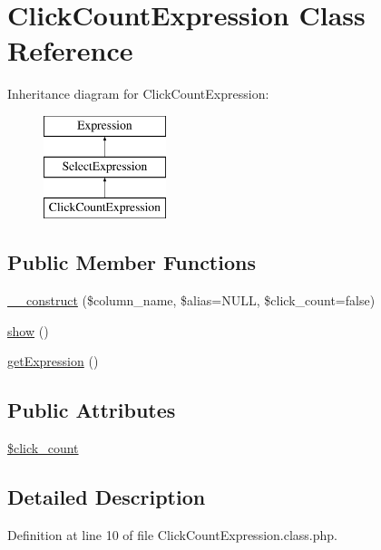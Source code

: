 \hypertarget{classClickCountExpression}{\section{Click\-Count\-Expression Class Reference}
\label{classClickCountExpression}
}
Inheritance diagram for Click\-Count\-Expression\-:\begin{figure}[H]
\begin{center}
\leavevmode
\includegraphics[height=3.000000cm]{classClickCountExpression}
\end{center}
\end{figure}
\subsection*{Public Member Functions}
\begin{DoxyCompactItemize}
\item 
\hyperlink{classClickCountExpression_a48a72584f461477625e53b9a03dbc0fc}{\-\_\-\-\_\-construct} (\$column\-\_\-name, \$alias=N\-U\-L\-L, \$click\-\_\-count=false)
\item 
\hyperlink{classClickCountExpression_a19b7767f37c3dd3461db66b741ff83f6}{show} ()
\item 
\hyperlink{classClickCountExpression_acd86ecac8f6416d56024e241ba115473}{get\-Expression} ()
\end{DoxyCompactItemize}
\subsection*{Public Attributes}
\begin{DoxyCompactItemize}
\item 
\hyperlink{classClickCountExpression_ae2f2beae2bcbb1e22dac9f84853a1226}{\$click\-\_\-count}
\end{DoxyCompactItemize}


\subsection{Detailed Description}


Definition at line 10 of file Click\-Count\-Expression.\-class.\-php.




